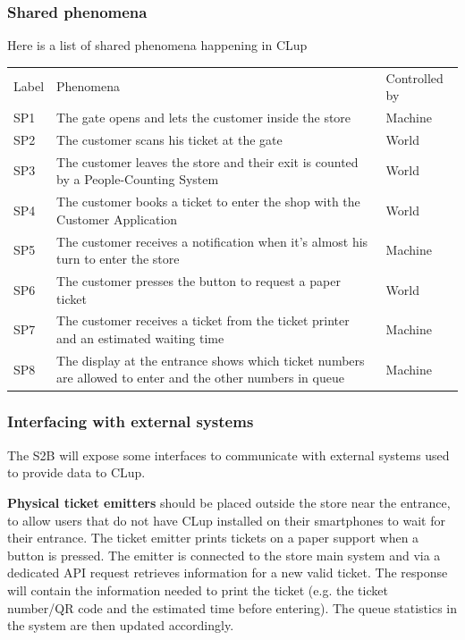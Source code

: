 \subsubsection{Shared phenomena}
Here is a list of shared phenomena happening in CLup

\renewcommand{\arraystretch}{1.4}
\begin{tabular}{C{1cm}L{10.5cm}C{2.6cm}}
    Label & Phenomena                                                                                                  & Controlled by \\
    SP1   & The gate opens and lets the customer inside the store                                                      & Machine       \\
    SP2   & The customer scans his ticket at the gate                                                                  & World         \\
    SP3   & The customer leaves the store and their exit is counted by a People-Counting System                        & World         \\
    SP4   & The customer books a ticket to enter the shop with the Customer Application                                & World         \\
    SP5   & The customer receives a notification when it's almost his turn to enter the store                            & Machine       \\
    SP6   & The customer presses the button to request a paper ticket                                                  & World         \\
    SP7   & The customer receives a ticket from the ticket printer and an estimated waiting time                       & Machine       \\
    SP8   & The display at the entrance shows which ticket numbers are allowed to enter and the other numbers in queue & Machine       \\
\end{tabular}

\subsubsection{Interfacing with external systems}
The S2B will expose some interfaces to communicate with external systems used to provide data to CLup.


\textbf{Physical ticket emitters} should be placed outside the store near the entrance, to allow users that do not have CLup installed on their smartphones to wait for their entrance. The ticket emitter prints tickets on a paper support when a button is pressed. The emitter is connected to the store main system and via a dedicated API request retrieves information for a new valid ticket. The response will contain the information needed to print the ticket (e.g. the ticket number/QR code and the estimated time before entering). The queue statistics in the system are then updated accordingly.

